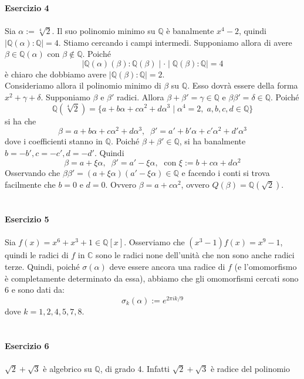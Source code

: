 \documentclass[12pt,a4paper]{report}
\theoremstyle{definition}
\begin{document}
\\
\\
\\
\noindent\textbf{Esercizio 4}\\
\\
Sia $\alpha:=\sqrt[4]{2}$. Il suo polinomio minimo su $\mathbb{Q}$ è banalmente $x^4-2$, quindi $\mid \mathbb{Q}(\alpha):\mathbb{Q} \mid=4$. Stiamo cercando i campi intermedi. Supponiamo allora di avere $\beta \in \mathbb{Q}(\alpha)$ con $\beta \not\in \mathbb{Q}$. Poiché
$$\mid \mathbb{Q}(\alpha)(\beta):\mathbb{Q}(\beta) \mid \cdot \mid \mathbb{Q}(\beta):\mathbb{Q} \mid =4$$
è chiaro che dobbiamo avere $\mid \mathbb{Q}(\beta):\mathbb{Q} \mid=2$.\\
Consideriamo allora il polinomio minimo di $\beta$ su $\mathbb{Q}$. Esso dovrà essere della forma $x^2+\gamma+\delta$. Supponiamo $\beta$ e $\beta'$ radici. Allora $\beta+\beta'=\gamma \in \mathbb{Q}$ e $\beta \beta'=\delta \in \mathbb{Q}$. Poiché
$$\mathbb{Q}(\sqrt[4]{2})=\{a+b\alpha+c\alpha^2+d\alpha^3 \mid \alpha^4=2, \; a,b,c,d \in \mathbb{Q}\}$$
si ha che 
$$\beta=a+b\alpha+c\alpha^2+d\alpha^3, \; \; \beta'=a'+b'\alpha+c'\alpha^2+d'\alpha^3$$
dove i coefficienti stanno in $\mathbb{Q}$. Poiché $\beta+\beta' \in \mathbb{Q}$, si ha banalmente $b=-b', c=-c', d=-d'$. Quindi
$$\beta=a+ \xi \alpha, \; \; \beta'=a'-\xi \alpha, \; \text{ con } \xi:=b+c\alpha+d\alpha^2$$
Osservando che $\beta\beta'=(a+\xi\alpha)(a'-\xi\alpha) \in \mathbb{Q}$ e facendo i conti si trova facilmente che $b=0$ e $d=0$. Ovvero $\beta=a+c\alpha^2$, ovvero $Q(\beta)=\mathbb{Q}(\sqrt{2})$.
\\
\\
\\
\noindent\textbf{Esercizio 5}\\
\\
Sia $f(x)=x^6+x^3+1 \in \mathbb{Q}[x]$. Osserviamo che $(x^3-1)f(x)=x^9-1$, quindi le radici di $f$ in $\mathbb{C}$ sono le radici none dell'unità che non sono anche radici terze. Quindi, poiché $\sigma(\alpha)$ deve essere ancora una radice di $f$ (e l'omomorfismo è completamente determinato da essa), abbiamo che gli omomorfismi cercati sono 6 e sono dati da:
$$\sigma_k(\alpha):= e^{2\pi i k/9}$$
dove $k=1,2,4,5,7,8$.
\\
\\
\\
\noindent\textbf{Esercizio 6}\\
\\
$\sqrt{2}+\sqrt{3}$ è algebrico su $\mathbb{Q}$, di grado 4. Infatti $\sqrt{2}+\sqrt{3}$ è radice del polinomio
\end{document}
